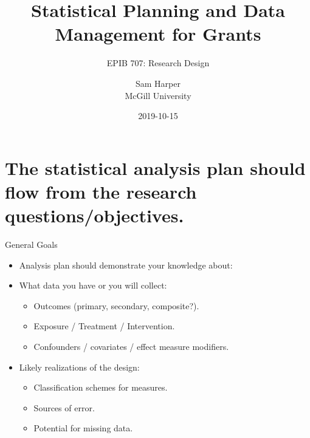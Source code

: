\documentclass[ignorenonframetext,]{beamer}
\title{Statistical Planning and Data Management for Grants}
\subtitle{EPIB 707: Research Design}
\author{Sam Harper\\
McGill University}
\date{2019-10-15}
\providecommand{\tightlist}{%
  \setlength{\itemsep}{0pt}\setlength{\parskip}{0pt}}
\begin{document}
\frame{\titlepage}

\hypertarget{the-statistical-analysis-plan-should-flow-from-the-research-questionsobjectives.}{%
\section{The statistical analysis plan should flow from the research
questions/objectives.}\label{the-statistical-analysis-plan-should-flow-from-the-research-questionsobjectives.}}

\begin{frame}{General Goals}
\protect\hypertarget{general-goals}{}

\begin{itemize}
\item
  Analysis plan should demonstrate your knowledge about:
\item
  What data you have or you will collect:

  \begin{itemize}
  \tightlist
  \item
    Outcomes (primary, secondary, composite?).
  \item
    Exposure / Treatment / Intervention.
  \item
    Confounders / covariates / effect measure modifiers.
  \end{itemize}
\item
  Likely realizations of the design:

  \begin{itemize}
  \tightlist
  \item
    Classification schemes for measures.
  \item
    Sources of error.
  \item
    Potential for missing data.
  \end{itemize}
\end{itemize}

\end{frame}
\end{document}
